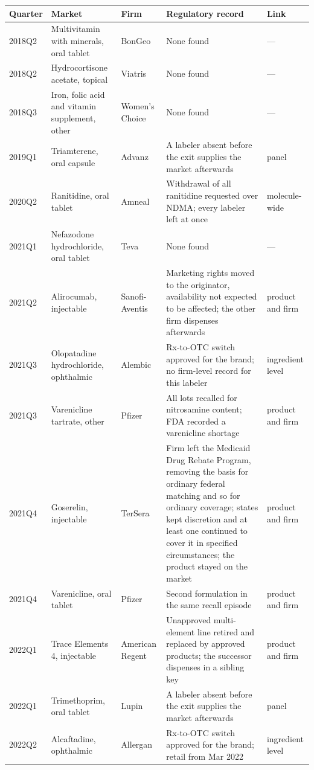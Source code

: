 \begin{tabular}{@{}lp{2.9cm}p{1.7cm}p{3.9cm}p{1.5cm}@{}}
\toprule
Quarter & Market & Firm & Regulatory record & Link \\
\midrule
2018Q2 & Multivitamin with minerals, oral tablet & BonGeo & None found & --- \\
2018Q2 & Hydrocortisone acetate, topical & Viatris & None found & --- \\
2018Q3 & Iron, folic acid and vitamin supplement, other & Women's Choice & None found & --- \\
2019Q1 & Triamterene, oral capsule & Advanz & A labeler absent before the exit supplies the market afterwards & panel \\
2020Q2 & Ranitidine, oral tablet & Amneal & Withdrawal of all ranitidine requested over NDMA; every labeler left at once & molecule-wide \\
2021Q1 & Nefazodone hydrochloride, oral tablet & Teva & None found & --- \\
2021Q2 & Alirocumab, injectable & Sanofi-Aventis & Marketing rights moved to the originator, availability not expected to be affected; the other firm dispenses afterwards & product and firm \\
2021Q3 & Olopatadine hydrochloride, ophthalmic & Alembic & Rx-to-OTC switch approved for the brand; no firm-level record for this labeler & ingredient level \\
2021Q3 & Varenicline tartrate, other & Pfizer & All lots recalled for nitrosamine content; FDA recorded a varenicline shortage & product and firm \\
2021Q4 & Goserelin, injectable & TerSera & Firm left the Medicaid Drug Rebate Program, removing the basis for ordinary federal matching and so for ordinary coverage; states kept discretion and at least one continued to cover it in specified circumstances; the product stayed on the market & product and firm \\
2021Q4 & Varenicline, oral tablet & Pfizer & Second formulation in the same recall episode & product and firm \\
2022Q1 & Trace Elements 4, injectable & American Regent & Unapproved multi-element line retired and replaced by approved products; the successor dispenses in a sibling key & product and firm \\
2022Q1 & Trimethoprim, oral tablet & Lupin & A labeler absent before the exit supplies the market afterwards & panel \\
2022Q2 & Alcaftadine, ophthalmic & Allergan & Rx-to-OTC switch approved for the brand; retail from Mar 2022 & ingredient level \\

\end{tabular}
